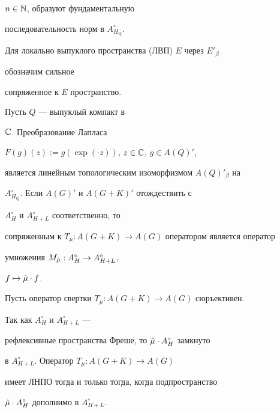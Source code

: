 $n\in\Bbb N$, образуют фундаментальную 


последовательность норм в $A^\circ_{H_Q}$. 


 


Для локально выпуклого пространства (ЛВП) $E$ через $E'_\beta$ 


обозначим сильное 


сопряженное к $E$ пространство. 


 


\begin{lem} Пусть $Q$ --- выпуклый компакт в 


$\Bbb C$. Преобразование Лапласа \linebreak




$F(g)(z):=g(\exp(\cdot z))$, $z\in\Bbb C$, $g\in A(Q)'$,


является линейным топологическим изоморфизмом $A(Q)'_\beta$ на 


$A^\circ_{H_Q}$. Если $A(G)'$ и $A(G+K)'$ отождествить с 


$A^\circ_H$ и $A^\circ_{H+L}$ соответственно, то 


сопряженным к $T_\mu :A(G+K)\to A(G)$ оператором является оператор 


умножения $M_{\Hat\mu}:A^\circ_H\to A^\circ_{H+L}$, 


$f\mapsto \Hat\mu\cdot f$. 


\end{lem} 


 


\begin{note} Пусть оператор свертки $T_\mu :A(G+K)\to A(G)$ сюръективен. 


Так как $A^\circ_H$ и $A^\circ_{H+L}$ --- 


рефлексивные пространства Фреше, то $\Hat\mu\cdot A^\circ_H$ замкнуто 


в $A^\circ_{H+L}$. Оператор $T_\mu :A(G+K)\to A(G)$ 


имеет ЛНПО тогда и только тогда, когда подпространство 


$\Hat\mu\cdot A^\circ_H$ дополнимо в $A^\circ_{H+L}$. 


\end{note} 


 


